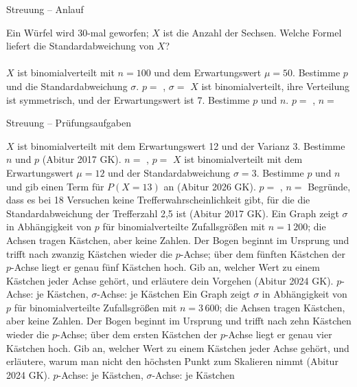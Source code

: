 \begin{aufgabe}{Streuung – Anlauf}
\begin{teile}
\teil Ein Würfel wird 30-mal geworfen; $X$ ist die Anzahl der Sechsen. Welche Formel liefert die Standardabweichung von $X$? \\  \\ 
\teil $X$ ist binomialverteilt mit $n = 100$ und dem Erwartungswert $\mu = 50$. Bestimme $p$ und die Standardabweichung $\sigma$. $p = $ \leerfeld , $\sigma = $ \leerfeld
\teil $X$ ist binomialverteilt, ihre Verteilung ist symmetrisch, und der Erwartungswert ist 7. Bestimme $p$ und $n$. $p = $ \leerfeld , $n = $ \leerfeld
\end{teile}
\end{aufgabe}

\begin{aufgabe}{Streuung – Prüfungsaufgaben}
\begin{teile}
\teil $X$ ist binomialverteilt mit dem Erwartungswert 12 und der Varianz 3. Bestimme $n$ und $p$ \hfill (Abitur 2017 GK). $n = $ \leerfeld , $p = $ \leerfeld
\teil $X$ ist binomialverteilt mit dem Erwartungswert $\mu = 12$ und der Standardabweichung $\sigma = 3$. Bestimme $p$ und $n$ und gib einen Term für $P(X = 13)$ an \hfill (Abitur 2026 GK). $p = $ \leerfeld , $n = $ \leerfeld
\teil Begründe, dass es bei 18 Versuchen keine Trefferwahrscheinlichkeit gibt, für die die Standardabweichung der Trefferzahl 2{,}5 ist \hfill (Abitur 2017 GK).
\teil Ein Graph zeigt $\sigma$ in Abhängigkeit von $p$ für binomialverteilte Zufallsgrößen mit $n = 1\,200$; die Achsen tragen Kästchen, aber keine Zahlen. Der Bogen beginnt im Ursprung und trifft nach zwanzig Kästchen wieder die $p$-Achse; über dem fünften Kästchen der $p$-Achse liegt er genau fünf Kästchen hoch. Gib an, welcher Wert zu einem Kästchen jeder Achse gehört, und erläutere dein Vorgehen \hfill (Abitur 2024 GK). $p$-Achse: \leerfeld je Kästchen, $\sigma$-Achse: \leerfeld je Kästchen
\teil Ein Graph zeigt $\sigma$ in Abhängigkeit von $p$ für binomialverteilte Zufallsgrößen mit $n = 3\,600$; die Achsen tragen Kästchen, aber keine Zahlen. Der Bogen beginnt im Ursprung und trifft nach zehn Kästchen wieder die $p$-Achse; über dem ersten Kästchen der $p$-Achse liegt er genau vier Kästchen hoch. Gib an, welcher Wert zu einem Kästchen jeder Achse gehört, und erläutere, warum man nicht den höchsten Punkt zum Skalieren nimmt \hfill (Abitur 2024 GK). $p$-Achse: \leerfeld je Kästchen, $\sigma$-Achse: \leerfeld je Kästchen
\end{teile}
\end{aufgabe}

